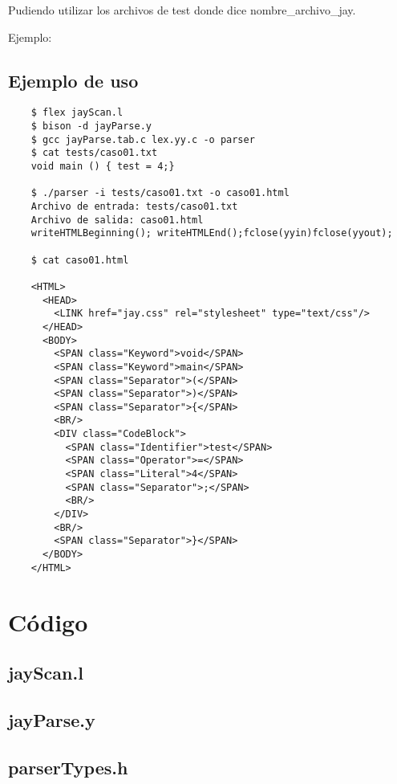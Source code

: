 \documentclass[a4paper,spanish]{article}
\begin{document}
Pudiendo utilizar los archivos de test donde dice nombre\_archivo\_jay.

Ejemplo:
\subsection{Ejemplo de uso}
    \begin{verbatim}
    $ flex jayScan.l 
    $ bison -d jayParse.y 
    $ gcc jayParse.tab.c lex.yy.c -o parser
    $ cat tests/caso01.txt 
    void main () { test = 4;}

    $ ./parser -i tests/caso01.txt -o caso01.html
    Archivo de entrada: tests/caso01.txt
    Archivo de salida: caso01.html
    writeHTMLBeginning(); writeHTMLEnd();fclose(yyin)fclose(yyout);

    $ cat caso01.html

    <HTML>
      <HEAD>
        <LINK href="jay.css" rel="stylesheet" type="text/css"/>
      </HEAD>
      <BODY>
        <SPAN class="Keyword">void</SPAN>
        <SPAN class="Keyword">main</SPAN>
        <SPAN class="Separator">(</SPAN>
        <SPAN class="Separator">)</SPAN>
        <SPAN class="Separator">{</SPAN>
        <BR/>
        <DIV class="CodeBlock">
          <SPAN class="Identifier">test</SPAN>
          <SPAN class="Operator">=</SPAN>
          <SPAN class="Literal">4</SPAN>
          <SPAN class="Separator">;</SPAN>
          <BR/>
        </DIV>
        <BR/>
        <SPAN class="Separator">}</SPAN>
      </BODY>
    </HTML>
\end{verbatim}
\pagebreak

\section{C\'odigo}

\subsection{jayScan.l}

\subsection{jayParse.y}


\subsection{parserTypes.h}
\end{document}
